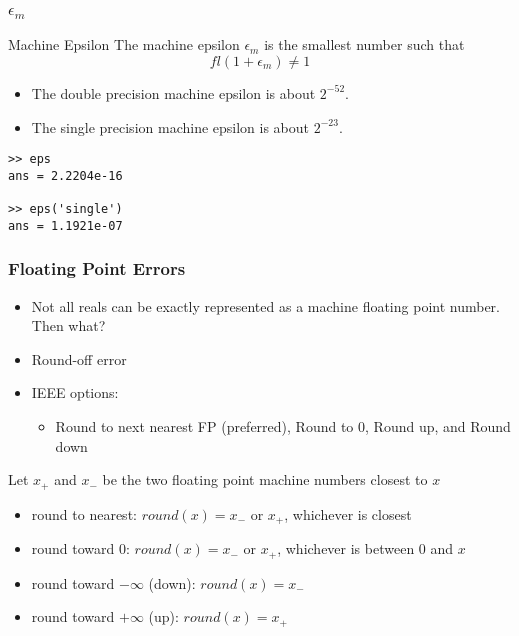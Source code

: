 \documentclass[10pt]{beamer}
\begin{document}
\begin{frame}[fragile]
\frametitle{$\epsilon_m$}
\begin{block}{Machine Epsilon}
The
machine epsilon $\epsilon_m$ is the smallest number such that
\begin{equation*}
  fl(1+\epsilon_m) \ne 1
\end{equation*}
\begin{itemize}
  \item The double precision machine epsilon is about $2^{-52}$.  
  \item The single precision machine epsilon is about $2^{-23}$.  
\end{itemize}

\bigskip
\end{block}
\begin{lstlisting}
>> eps
ans = 2.2204e-16

>> eps('single')
ans = 1.1921e-07
\end{lstlisting}
\end{frame}
\begin{frame}
\begin{center}
\end{center}
\end{frame}
\begin{frame}
\frametitle{Floating Point Errors}
\begin{itemize}
  \item Not all reals can be exactly represented as a machine floating
point number.  Then what?
  \item Round-off error
  \item IEEE options: 
\begin{itemize}
    \item Round to next nearest FP (preferred), Round to 0,
Round up, and Round down
\end{itemize}
\end{itemize}
Let $x_+$ and $x_-$ be the two floating point machine numbers closest to $x$
\begin{itemize}
  \item round to nearest: $round(x) = x_-$ or $x_+$, whichever is closest
  \item round toward 0: $round(x) = x_-$ or $x_+$, whichever is between 0 and
$x$
  \item round toward $-\infty$ (down): $round(x) = x_-$
  \item round toward $+\infty$ (up): $round(x) = x_+$
\end{itemize}
\end{frame}
\end{document}
